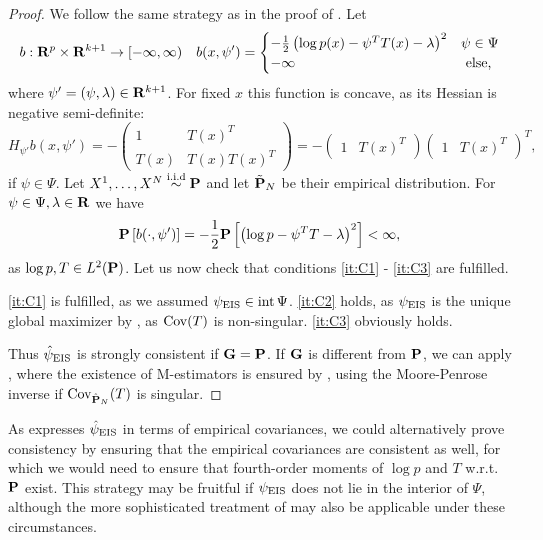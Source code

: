\begin{proof}
    We follow the same strategy as in the proof of . Let 
    \begin{align*}
        b: \R^{p} \times \R^{k + 1} \to [-\infty, \infty)  && b(x,\psi') = \begin{cases}
            -\frac{1}{2} \left( \log p(x) - \psi^{T}T(x) - \lambda \right)^{2} & \psi \in \Psi \\
            -\infty &  \text{ else,}
        \end{cases}
    \end{align*}
    where $\psi' = (\psi, \lambda) \in \R^{k + 1}$. For fixed $x$ this function is concave, as its Hessian is negative semi-definite:
    $$
        H_{\psi'} b(x, \psi') = -\begin{pmatrix}
            1 & T(x)^{T} \\
            T(x) & T(x)T(x)^{T}
        \end{pmatrix} = -\begin{pmatrix} 1 & T(x)^{T} \end{pmatrix} \begin{pmatrix} 1 & T(x)^{T} \end{pmatrix}^{T},
    $$
    if $\psi \in \Psi$. Let $X^{1}, \dots, X^{N} \iid \P$ and let $\tilde \P _{N}$ be their empirical distribution. For $\psi \in \Psi, \lambda \in \R$ we have 
    $$
        \P \left[ b(\cdot, \psi') \right] = - \frac{1}{2} \P \left[ \left( \log p - \psi^{T}T - \lambda\right)^{2} \right] < \infty,
    $$
    as $\log p, T\in L^{2}(\P)$. Let us now check that conditions \ref{it:C1} - \ref{it:C3} are fulfilled. 

    \ref{it:C1} is fulfilled, as we assumed $\peis \in \operatorname{int} \Psi$. \ref{it:C2} holds, as $\peis$ is the unique global maximizer by , as $\cov (T)$ is non-singular.
    \ref{it:C3} obviously holds. 

    Thus $\hpeis$ is strongly consistent if $\G = \P$. If $\G$ is different from $\P$, we can apply , where the existence of M-estimators is ensured by , using the Moore-Penrose inverse if $\cov_{\hat\P_{N}}(T)$ is singular. 
\end{proof}

As  expresses $\hpeis$ in terms of empirical covariances, we could alternatively prove consistency by ensuring that the empirical covariances are consistent as well, for which we would need to ensure that fourth-order moments of $\log p$ and $T$ w.r.t. $\P$ exist. This strategy may be fruitful if $\peis$ does not lie in the interior of $\Psi$, although the more sophisticated treatment of \citep{Haberman1989Concavity} may also be applicable under these circumstances.

